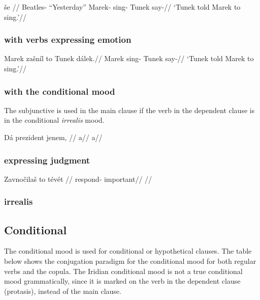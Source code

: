 \pex
\begingl
\gla \v{s}e //
\glb Beatles- ``Yesterday'' Marek- sing-  Tunek say-//
\glft `Tunek told Marek to sing.'//
\endgl
\xe

\subsubsection{with verbs expressing emotion}

\pex
\begingl
\gla Marek za\v{s}n\'il to Tunek dálek.//
\glb Marek sing-  Tunek say-//
\glft `Tunek told Marek to sing.'//
\endgl
\xe


\subsubsection{with the conditional mood}
\par The subjunctive is used in the main clause if the verb in the dependent clause is in the conditional \textit{irrealis} mood.

\pex
\begingl
\gla Dá prezident jenem, //
\glb a//
\glft a//
\endgl
\xe

\subsubsection{expressing judgment}

\pex
\begingl
\gla Zavno\v{c}ila\v{s} to t\'ev\'et //
\glb respond-  important//
\glft {}//
\endgl
\xe

\subsubsection{irrealis}

\subsection{Conditional}
\par The conditional mood is used for conditional or hypothetical clauses. The table below shows the conjugation paradigm for the conditional mood for both regular verbs and the copula. The Iridian conditional mood is not a true conditional mood grammatically, since it is marked on the verb in the dependent clause (protasis), instead of the main clause.

